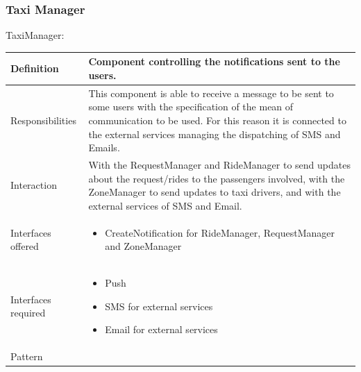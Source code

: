 \documentclass[a4paper,11pt]{report} %
\begin{document}
	\pagebreak
	\subsubsection{Taxi Manager}
	\begin{minipage}{\linewidth}
	\end{minipage} \linebreak
	\centerline{TaxiManager:}
	\begin{center}
		\begin{tabular}{| l | p{9cm} |}\hline
			Definition & Component controlling the notifications sent to the users.\\\hline
			Responsibilities & This component is able to receive a message to be sent to some users with the specification of the mean of communication to be used. For this reason it is connected to the external services managing the dispatching of SMS and Emails.\\\hline
			Interaction & With the RequestManager and RideManager to send updates about the request/rides to the passengers involved, with the ZoneManager to send updates to taxi drivers, and with the external services of SMS and Email.\\\hline
			Interfaces offered & \begin{itemize}
				\item CreateNotification for RideManager, RequestManager and ZoneManager
			\end{itemize}\\\hline
			Interfaces required & \begin{itemize}
				\item Push
				\item SMS for external services
				\item Email for external services
			\end{itemize}\\\hline
			Pattern & \\\hline
		\end{tabular}
	\end{center}	
	\pagebreak
\end{document}
